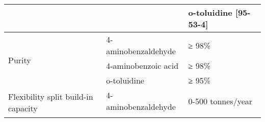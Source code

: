 \begin{landscape}
\begin{table}[h]
\begin{tabular}{@{}lll@{}}
\multicolumn{2}{l}{}                                                     & o-toluidine {[}95-53-4{]}                                                                                                                                                                                                                                                                                                                                                                                             \\ \midrule
\multirow{3}{*}{Purity}                              & 4-aminobenzaldehyde & ≥ 98\%                                                                                                                                                                                                                                                                                                                                                                                                                \\ \cmidrule(l){2-3} 
                                                     & 4-aminobenzoic acid & ≥ 98\%                                                                                                                                                                                                                                                                                                                                                                                                                \\ \cmidrule(l){2-3} 
                                                     & o-toluidine         & ≥ 95\%                                                                                                                                                                                                                                                                                                                                                                                                                \\ \midrule
\multirow{3}{*}{Flexibility split build-in capacity} & 4-aminobenzaldehyde & 0-500 tonnes/year                                                                                                                                                                                                                                                                                                                                                                                                     \\ \cmidrule(l){2-3} 

\end{tabular}
\end{table}
\end{landscape}
